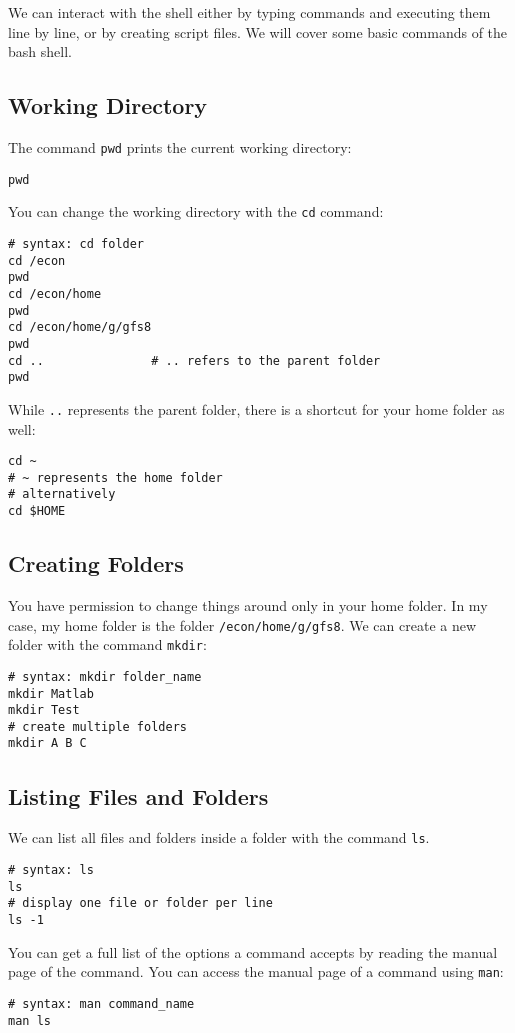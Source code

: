 \documentclass[12pt, a4paper]{article}
\begin{document}
We can interact with the shell either by typing commands and executing them line by line, or by creating script files.
We will cover some basic commands of the bash shell.
\subsection{Working Directory}
\label{sec:org5e5265b}
The command \texttt{pwd} prints the current working directory:
\lstset{language=bash,label= ,caption= ,captionpos=b,firstnumber=1,numbers=left,style=bash}
\begin{lstlisting}
pwd
\end{lstlisting}
You can change the working directory with the \texttt{cd} command:
\lstset{language=bash,label= ,caption= ,captionpos=b,firstnumber=1,numbers=left,style=bash}
\begin{lstlisting}
# syntax: cd folder
cd /econ
pwd
cd /econ/home
pwd
cd /econ/home/g/gfs8
pwd
cd ..				# .. refers to the parent folder
pwd
\end{lstlisting}
While \texttt{..} represents the parent folder, there is a shortcut for your home folder as well:
\lstset{language=bash,label= ,caption= ,captionpos=b,firstnumber=1,numbers=left,style=bash}
\begin{lstlisting}
cd ~
# ~ represents the home folder
# alternatively
cd $HOME
\end{lstlisting}
\subsection{Creating Folders}
\label{sec:orgc12b9a8}
You have permission to change things around only in your home folder.
In my case, my home folder is the folder \texttt{/econ/home/g/gfs8}.
We can create a new folder with the command \texttt{mkdir}:
\lstset{language=bash,label= ,caption= ,captionpos=b,firstnumber=1,numbers=left,style=bash}
\begin{lstlisting}
# syntax: mkdir folder_name
mkdir Matlab
mkdir Test
# create multiple folders
mkdir A B C
\end{lstlisting}
\subsection{Listing Files and Folders}
\label{sec:org4183341}
We can list all files and folders inside a folder with the command \texttt{ls}.
\lstset{language=bash,label= ,caption= ,captionpos=b,firstnumber=1,numbers=left,style=bash}
\begin{lstlisting}
# syntax: ls
ls
# display one file or folder per line
ls -1
\end{lstlisting}
You can get a full list of the options a command accepts by reading the manual page of the command.
You can access the manual page of a command using \texttt{man}:
\lstset{language=bash,label= ,caption= ,captionpos=b,firstnumber=1,numbers=left,style=bash}
\begin{lstlisting}
# syntax: man command_name
man ls
\end{lstlisting}
\end{document}
